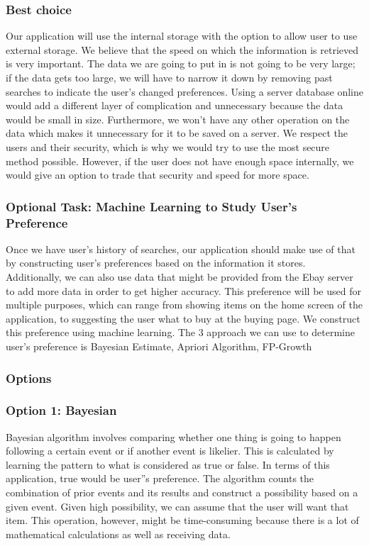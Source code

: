 \documentclass[journal,compsoc, 10pt, draftclsnofoot, onecolumn]{IEEEtran}
\begin{document}
\subsubsection*{Best choice}
Our application will use the internal storage with the option to allow user to use
external storage. We believe that the speed on which the information is retrieved is
very important. The data we are going to put in is not going to be very large; if the
data gets too large, we will have to narrow it down by removing past searches to
indicate the user's changed preferences. Using a server database online would add a
different layer of complication and unnecessary because the data would be small in
size. Furthermore, we won't have any other operation on the data which makes it
unnecessary for it to be saved on a server. We respect the users and their security,
which is why we would try to use the most secure method possible. However, if the
user does not have enough space internally, we would give an option to trade that
security and speed for more space.

\subsubsection*{Optional Task: Machine Learning to Study User's Preference}
Once we have user's history of searches, our application should make use of that by
constructing user's preferences based on the information it stores. Additionally, we
can also use data that might be provided from the Ebay server to add more data in
order to get higher accuracy. This preference will be used for multiple purposes,
which can range from showing items on the home screen of the application, to
suggesting the user what to buy at the buying page. We construct this preference
using machine learning.
The 3 approach we can use to determine user's preference is Bayesian Estimate,
Apriori Algorithm, FP-Growth

\subsubsection*{Options}
\subsubsection*{Option 1: Bayesian}
Bayesian algorithm involves comparing whether one thing is going to happen following
a certain event or if another event is likelier. This is calculated by learning the
pattern to what is considered as true or false. In terms of this application, true
would be user''s preference. The algorithm counts the combination of prior events and
its results and construct a possibility based on a given event. Given high
possibility, we can assume that the user will want that item. This operation,
however, might be time-consuming because there is a lot of mathematical calculations
as well as receiving data.
\end{document}
